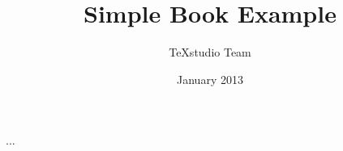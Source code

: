 \documentclass[a4paper,12pt]{book}
\begin{document}
\author{TeXstudio Team}
\title{Simple Book Example}
\date{January 2013}

\frontmatter
\maketitle
\tableofcontents



\mainmatter
\setcounter{chapter}{-1}
















\begin{appendices}
	\renewcommand{\thechapter}{\arabic{chapter}}
	\setcounter{chapter}{0}
	
	...
\end{appendices}
\end{document}
